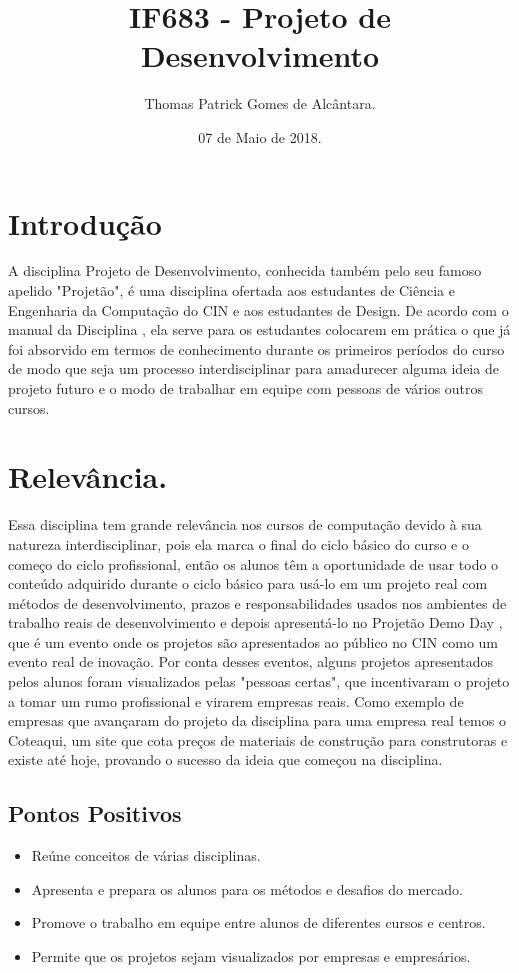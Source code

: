 \documentclass[a4paper]{article}
\title{IF683 - Projeto de Desenvolvimento}
\author{Thomas Patrick Gomes de Alcântara.}
\date{07 de Maio de 2018.}
\begin{document}
\maketitle


\section{Introdução}
A disciplina Projeto de Desenvolvimento\cite{wiki}, conhecida também pelo seu famoso apelido "Projetão", é uma disciplina ofertada aos estudantes de Ciência e Engenharia da Computação do CIN e aos estudantes de Design.
De acordo com o manual da Disciplina \cite{manual}, ela serve para os estudantes colocarem em prática o que já foi absorvido em termos de conhecimento durante os primeiros períodos do curso de modo que seja um processo interdisciplinar para amadurecer alguma ideia de projeto futuro e o modo de trabalhar em equipe com pessoas de vários outros cursos.


\section{Relevância.}
Essa disciplina tem grande relevância nos cursos de computação devido à sua natureza interdisciplinar, pois ela marca o final do ciclo básico do curso e o começo do ciclo profissional, então os alunos têm a oportunidade de usar todo o conteúdo adquirido durante o ciclo básico para usá-lo em um projeto real com métodos de desenvolvimento, prazos e responsabilidades usados nos ambientes de trabalho reais de desenvolvimento e depois apresentá-lo no Projetão Demo Day , que é um evento onde os projetos são apresentados ao público no CIN como um evento real de inovação. Por conta desses eventos, alguns projetos apresentados pelos alunos foram visualizados pelas "pessoas certas", que incentivaram o projeto a tomar um rumo profissional e virarem empresas reais. Como exemplo de empresas que avançaram do projeto da disciplina para uma empresa real temos o Coteaqui, um site que cota preços de materiais de construção para construtoras e existe até hoje, provando o sucesso da ideia que começou na disciplina.
 
\subsection{Pontos Positivos}

\begin{itemize}
\item Reúne conceitos de várias disciplinas.
\item Apresenta e prepara os alunos para os métodos e desafios do mercado.
\item Promove o trabalho em equipe entre alunos de diferentes cursos e centros.
\item Permite que os projetos sejam visualizados por empresas e empresários.

\end{itemize}
\end{document}
